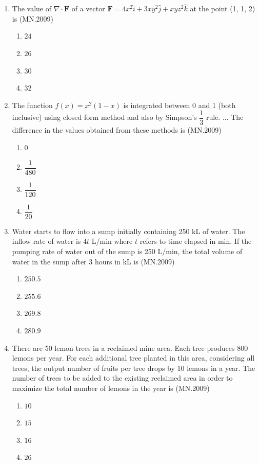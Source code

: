\documentclass[journal]{IEEEtran}
\numberwithin{equation}{enumi}
\numberwithin{figure}{enumi}
\begin{document}
\begin{enumerate}
    \item The value of $\nabla \cdot \mathbf{F}$ of a vector $\mathbf{F} = 4x^2 \hat{i} + 3xy^2 \hat{j} + xyz^2 \hat{k}$ at the point (1, 1, 2) is
    \hfill{(MN.2009)}
    \begin{enumerate}[label=(\Alph*)]
        \item $24$
        \item $26$
        \item $30$
        \item $32$
    \end{enumerate}

  \item The function $f(x) = x^2(1 - x)$ is integrated between 0 and 1 (both inclusive) using closed form method and also by Simpson's $\dfrac{1}{3}$ rule. ...
     The difference in the values obtained from these methods is
  \hfill{(MN.2009)}
    \begin{enumerate}[label=(\Alph*)]
        \item 0
        \item $\dfrac{1}{480}$
        \item $\dfrac{1}{120}$
        \item $\dfrac{1}{20}$
    \end{enumerate}

    \item Water starts to flow into a sump initially containing 250 kL of water. The inflow rate of water is $4t$ L/min where $t$ refers to time elapsed in min. If the pumping rate of water out of the sump is 250 L/min, the total volume of water in the sump after 3 hours in kL is
    \hfill{(MN.2009)}
    \begin{enumerate}[label=(\Alph*)]
        \item $250.5$
        \item $255.6$
        \item $269.8$
        \item $280.9$
    \end{enumerate}

    \item There are 50 lemon trees in a reclaimed mine area. Each tree produces 800 lemons per year. For each additional tree planted in this area, considering all trees, the output number of fruits per tree drops by 10 lemons in a year. The number of trees to be added to the existing reclaimed area in order to maximize the total number of lemons in the year is
    \hfill{(MN.2009)}
    \begin{enumerate}[label=(\Alph*)]
        \item $10$
        \item $15$
        \item $16$
        \item $26$
    \end{enumerate}


\end{enumerate}
\end{document}
